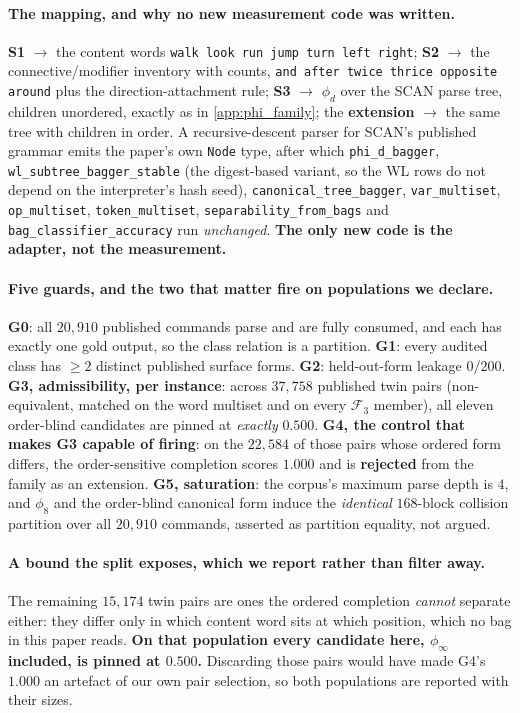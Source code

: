 \paragraph{The mapping, and why no new measurement code was written.} \textbf{S1} $\to$ the content words \texttt{walk look run jump turn left right}; \textbf{S2} $\to$ the connective/modifier inventory with counts, \texttt{and after twice thrice opposite around} plus the direction-attachment rule; \textbf{S3} $\to$ $\phi_d$ over the SCAN parse tree, children unordered, exactly as in \ref{app:phi_family}; the \textbf{extension} $\to$ the same tree with children in order. A recursive-descent parser for SCAN's published grammar emits the paper's own \texttt{Node} type, after which \texttt{phi\_d\_bagger}, \texttt{wl\_subtree\_bagger\_stable} (the digest-based variant, so the WL rows do not depend on the interpreter's hash seed), \texttt{canonical\_tree\_bagger}, \texttt{var\_multiset}, \texttt{op\_multiset}, \texttt{token\_multiset}, \texttt{separability\_from\_bags} and \texttt{bag\_classifier\_accuracy} run \emph{unchanged}. \textbf{The only new code is the adapter, not the measurement.}

\paragraph{Five guards, and the two that matter fire on populations we declare.} \textbf{G0}: all $20{,}910$ published commands parse and are fully consumed, and each has exactly one gold output, so the class relation is a partition. \textbf{G1}: every audited class has $\geq2$ distinct published surface forms. \textbf{G2}: held-out-form leakage $0/200$. \textbf{G3, admissibility, per instance}: across $37{,}758$ published twin pairs (non-equivalent, matched on the word multiset and on every $\mathcal{F}_3$ member), all eleven order-blind candidates are pinned at \emph{exactly} $0.500$. \textbf{G4, the control that makes G3 capable of firing}: on the $22{,}584$ of those pairs whose ordered form differs, the order-sensitive completion scores $1.000$ and is \textbf{rejected} from the family as an extension. \textbf{G5, saturation}: the corpus's maximum parse depth is $4$, and $\phi_8$ and the order-blind canonical form induce the \emph{identical} $168$-block collision partition over all $20{,}910$ commands, asserted as partition equality, not argued.

\paragraph{A bound the split exposes, which we report rather than filter away.} The remaining $15{,}174$ twin pairs are ones the ordered completion \emph{cannot} separate either: they differ only in which content word sits at which position, which no bag in this paper reads. \textbf{On that population every candidate here, $\phi_\infty$ included, is pinned at $0.500$.} Discarding those pairs would have made G4's $1.000$ an artefact of our own pair selection, so both populations are reported with their sizes.

